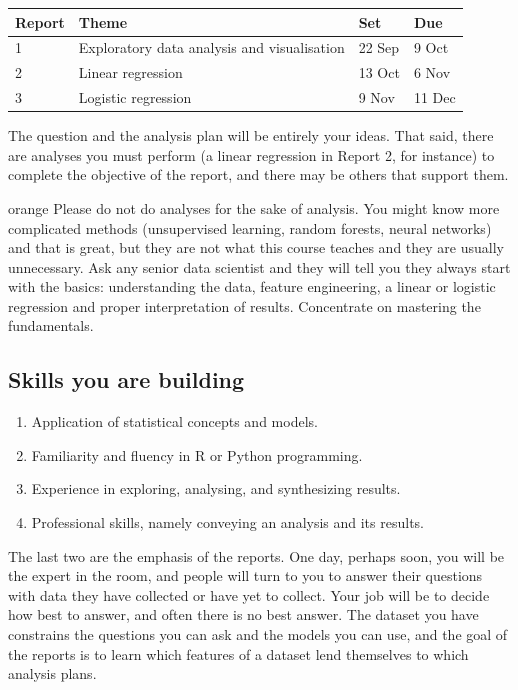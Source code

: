 \documentclass[11pt,letterpaper]{article}
\newcommand{\warningbox}[1]{%
  \begin{callout}[title={\sffamily\fontsize{7.5}{9}\selectfont\color{accent}\MakeUppercase{WARNING}}]{orange}
  #1
  \end{callout}%
}
\begin{document}
\begin{center}
\renewcommand{\arraystretch}{1.15}
\begin{tabular}{p{} p{} p{} p{}}
\toprule
Report & Theme & Set & Due\\
\midrule
1 & Exploratory data analysis and visualisation & 22 Sep & 9 Oct\\
2 & Linear regression & 13 Oct & 6 Nov\\
3 & Logistic regression & 9 Nov & 11 Dec\\
\bottomrule
\end{tabular}
\end{center}

The question and the analysis plan will be entirely your ideas. That said, there are analyses you must perform (a linear regression in Report 2, for instance) to complete the objective of the report, and there may be others that support them.\\

\warningbox{Please do not do analyses for the sake of analysis. You might know more complicated methods (unsupervised learning, random forests, neural networks) and that is great, but they are not what this course teaches and they are usually unnecessary. Ask any senior data scientist and they will tell you they always start with the basics: understanding the data, feature engineering, a linear or logistic regression and proper interpretation of results. Concentrate on mastering the fundamentals.}

\subsection*{Skills you are building}
\begin{enumerate}[leftmargin=18pt,itemsep=3pt]
  \item Application of statistical concepts and models.
  \item Familiarity and fluency in R or Python programming.
  \item Experience in exploring, analysing, and synthesizing results.
  \item Professional skills, namely conveying an analysis and its results.
\end{enumerate}

The last two are the emphasis of the reports. One day, perhaps soon, you will be the expert in the room, and people will turn to you to answer their questions with data they have collected or have yet to collect. Your job will be to decide how best to answer, and often there is no best answer. The dataset you have constrains the questions you can ask and the models you can use, and the goal of the reports is to learn which features of a dataset lend themselves to which analysis plans.
\end{document}

